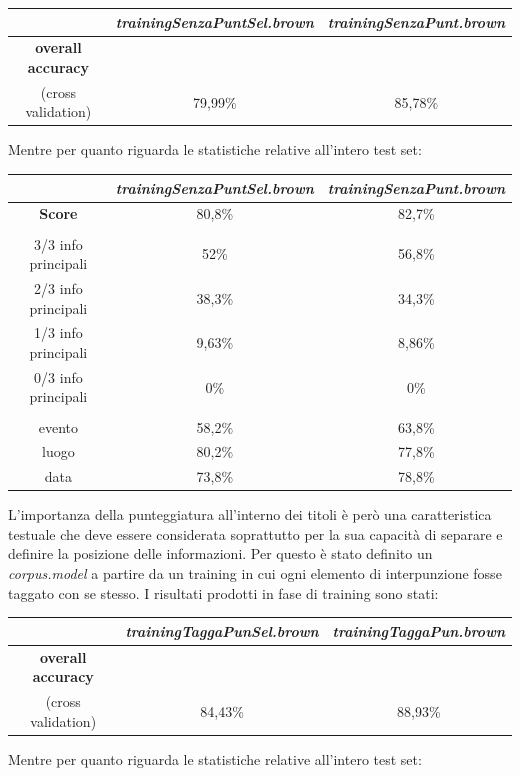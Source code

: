 \documentclass[a4paper]{report}
\begin{document}
\begin{center}
\begin{tabular}{c c c}
\hline
 & \textit{trainingSenzaPuntSel.brown} & \textit{trainingSenzaPunt.brown}\\
\hline
\textbf{overall accuracy} \\ (cross validation) & 79,99\% & 85,78\% \\
\hline
\end{tabular}
\end{center}
Mentre per quanto riguarda le statistiche relative all'intero test set:
\begin{center}
\begin{tabular}{|ccc|}
\hline
 & \textit{trainingSenzaPuntSel.brown} & \textit{trainingSenzaPunt.brown}\\
\hline
\textbf{Score} & 80,8\% & 82,7\% \\
\hline
 & &  \\
\hline
3/3 info principali & 52\% & 56,8\% \\
2/3 info principali & 38,3\% & 34,3\% \\
1/3 info principali & 9,63\% & 8,86\% \\
0/3 info principali & 0\% & 0\% \\
\hline
 & &  \\
\hline
evento & 58,2\% & 63,8\% \\
luogo & 80,2\% & 77,8\% \\
data & 73,8\% & 78,8\% \\
\hline
\end{tabular}
\end{center}
L'importanza della punteggiatura all'interno dei titoli è però una caratteristica testuale che deve essere considerata soprattutto per la sua capacità di separare e definire la posizione delle informazioni. Per questo è stato definito un \textit{corpus.model} a partire da un training in cui ogni elemento di interpunzione fosse taggato con se stesso.  I risultati prodotti in fase di training sono stati:
\begin{center}
\begin{tabular}{c c c}
\hline
 & \textit{trainingTaggaPunSel.brown} & \textit{trainingTaggaPun.brown}\\
\hline
\textbf{overall accuracy} \\ (cross validation) & 84,43\% & 88,93\% \\
\hline
\end{tabular}
\end{center}
Mentre per quanto riguarda le statistiche relative all'intero test set:
\end{document}
